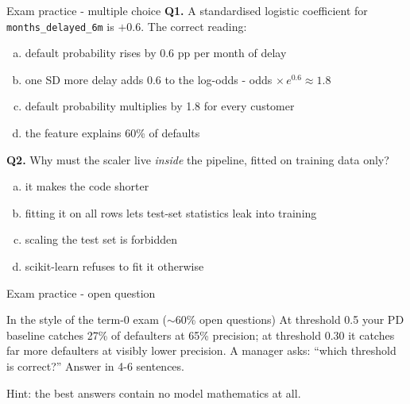 \documentclass[10pt,aspectratio=169]{beamer}
\begin{document}
\begin{frame}{Exam practice - multiple choice}
  \small
  \textbf{Q1.} A standardised logistic coefficient for
  \texttt{months\_delayed\_6m} is $+0.6$. The correct reading:
  \begin{enumerate}[(a)]
    \item default probability rises by 0.6 pp per month of delay
    \item one SD more delay adds $0.6$ to the log-odds - odds $\times\,e^{0.6}\approx 1.8$
    \item default probability multiplies by 1.8 for every customer
    \item the feature explains 60\% of defaults
  \end{enumerate}
  \vspace{0.4em}
  \textbf{Q2.} Why must the scaler live \emph{inside} the pipeline, fitted on
  training data only?
  \begin{enumerate}[(a)]
    \item it makes the code shorter
    \item fitting it on all rows lets test-set statistics leak into training
    \item scaling the test set is forbidden
    \item scikit-learn refuses to fit it otherwise
  \end{enumerate}
\end{frame}

\begin{frame}{Exam practice - open question}
  \begin{block}{In the style of the term-0 exam ($\sim$60\% open questions)}
    At threshold 0.5 your PD baseline catches 27\% of defaulters at 65\%
    precision; at threshold 0.30 it catches far more defaulters at visibly
    lower precision. A manager asks: ``which threshold is correct?''
    Answer in 4-6 sentences.
  \end{block}
  \vspace{0.5em}
  \begin{center}\small
    Hint: the best answers contain no model mathematics at all.
  \end{center}
\end{frame}
\end{document}
